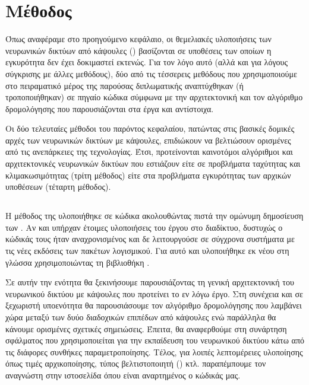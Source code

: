 \chapter{Μέθοδος}
\label{chap:method}

Όπως αναφέραμε στο προηγούμενο κεφάλαιο, οι θεμελιακές υλοποιήσεις των νευρωνικών δικτύων από κάψουλες (\cite{hinton2011transforming, sabour2017dynamic, hinton2018matrix}) βασίζονται σε υποθέσεις των οποίων η εγκυρότητα δεν έχει δοκιμαστεί εκτενώς. Για τον λόγο αυτό (αλλά και για λόγους σύγκρισης με άλλες μεθόδους), δύο από τις τέσσερεις μεθόδους που χρησιμοποιούμε στο πειραματικό μέρος της παρούσας διπλωματικής αναπτύχθηκαν (ή τροποποιήθηκαν) σε πηγαίο κώδικα σύμφωνα με την αρχιτεκτονική και τον αλγόριθμο δρομολόγησης που παρουσιάζονται στα έργα \cite{sabour2017dynamic} και \cite{hinton2018matrix} αντίστοιχα. \par

Οι δύο τελευταίες μέθοδοι του παρόντος κεφαλαίου, πατώντας στις βασικές δομικές αρχές των νευρωνικών δικτύων με κάψουλες, επιδιώκουν να βελτιώσουν ορισμένες από τις ανεπάρκειες της τεχνολογίας. Έτσι, προτείνονται καινοτόμοι αλγόριθμοι και αρχιτεκτονικές νευρωνικών δικτύων που εστιάζουν είτε σε προβλήματα ταχύτητας και κλιμακωσιμότητας (τρίτη μέθοδος) είτε στα προβλήματα εγκυρότητας των αρχικών υποθέσεων (τέταρτη μέθοδος).


\section{}
\label{sec:method_1}

Η μέθοδος της  υλοποιήθηκε σε κώδικα ακολουθώντας πιστά την ομώνυμη δημοσίευση των  \cite{sabour2017dynamic}. Αν και υπήρχαν έτοιμες υλοποιήσεις του έργου στο διαδίκτυο, δυστυχώς ο κώδικάς τους ήταν αναχρονισμένος και δε λειτουργούσε σε σύγχρονα συστήματα με τις νέες εκδόσεις των πακέτων λογισμικού. Για αυτό και υλοποιήθηκε εκ νέου στη γλώσσα  χρησιμοποιώντας τη βιβλιοθήκη . \par

Σε αυτήν την ενότητα θα ξεκινήσουμε παρουσιάζοντας τη γενική αρχιτεκτονική του νευρωνικού δικτύου με κάψουλες που προτείνει το εν λόγω έργο. Στη συνέχεια και σε ξεχωριστή υπο\textendash ενότητα θα παρουσιάσουμε τον αλγόριθμο δρομολόγησης που λαμβάνει χώρα μεταξύ των δυύο διαδοχικών επιπέδων από κάψουλες ενώ παράλληλα θα κάνουμε ορισμένες σχετικές σημειώσεις. Έπειτα, θα αναφερθούμε στη συνάρτηση σφάλματος που χρησιμοποιείται για την εκπαίδευση του νευρωνικού δικτύου κάτω από τις διάφορες συνθήκες παραμετροποίησης. Τέλος, για λοιπές λεπτομέρειες υλοποίησης όπως τιμές αρχικοποίησης, τύπος βελτιστοποιητή () κτλ. παραπέμπουμε τον αναγνώστη στην ιστοσελίδα όπου είναι αναρτημένος ο κώδικάς μας.

